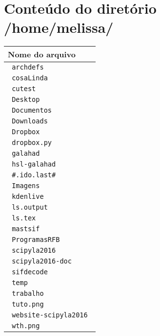 \documentclass{article}
\begin{document}
\section*{Conteúdo do diretório  /home/melissa/ }
\begin{center}
\begin{longtable}{|l|}\hline
\hline Nome do arquivo \\ \hline \endfirsthead
\verb+ archdefs +\\ 
\verb+ cosaLinda +\\ 
\verb+ cutest +\\ 
\verb+ Desktop +\\ 
\verb+ Documentos +\\ 
\verb+ Downloads +\\ 
\verb+ Dropbox +\\ 
\verb+ dropbox.py +\\ 
\verb+ galahad +\\ 
\verb+ hsl-galahad +\\ 
\verb+ #.ido.last# +\\ 
\verb+ Imagens +\\ 
\verb+ kdenlive +\\ 
\verb+ ls.output +\\ 
\verb+ ls.tex +\\ 
\verb+ mastsif +\\ 
\verb+ ProgramasRFB +\\ 
\verb+ scipyla2016 +\\ 
\verb+ scipyla2016-doc +\\ 
\verb+ sifdecode +\\ 
\verb+ temp +\\ 
\verb+ trabalho +\\ 
\verb+ tuto.png +\\ 
\verb+ website-scipyla2016 +\\ 
\verb+ wth.png +\\ 
\hline
\end{longtable}
\end{center}
\end{document}
